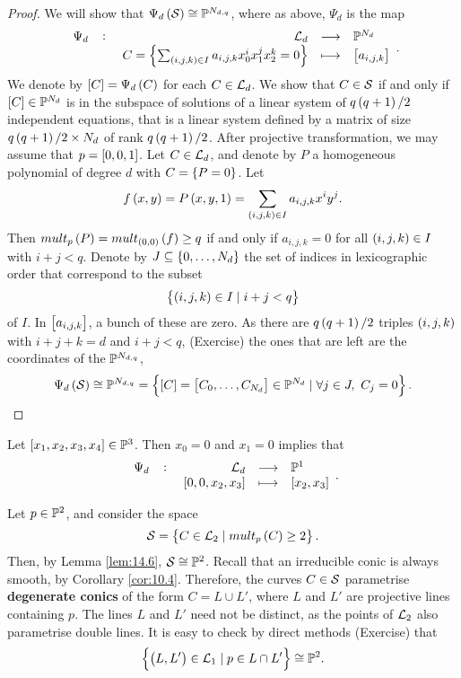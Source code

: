 \begin{proof}
We will show that $ \Psi_d\br{\SS} \cong \P^{N_{d, q}} $, where as above, $ \Psi_d $ is the map
$$ \function[\Psi_d]{\LL_d}{\P^{N_d}}{C = \cbr{\sum_{\br{i, j, k} \in I} a_{i, j, k}x_0^ix_1^jx_2^k = 0}}{\sbr{a_{i, j, k}}}. $$
We denote by $ \sbr{C} = \Psi_d\br{C} $ for each $ C \in \LL_d $. We show that $ C \in \SS $ if and only if $ \sbr{C} \in \P^{N_d} $ is in the subspace of solutions of a linear system of $ q\br{q + 1} / 2 $ independent equations, that is a linear system defined by a matrix of size $ q\br{q + 1} / 2 \times N_d $ of rank $ q\br{q + 1} / 2 $. After projective transformation, we may assume that $ p = \sbr{0, 0, 1} $. Let $ C \in \LL_d $, and denote by $ P $ a homogeneous polynomial of degree $ d $ with $ C = \cbr{P = 0} $. Let
$$ f\br{x, y} = P\br{x, y, 1} = \sum_{\br{i, j, k} \in I} a_{i, j, k}x^iy^j. $$
Then $ mult_p\br{P} = mult_{\br{0, 0}}\br{f} \ge q $ if and only if $ a_{i, j, k} = 0 $ for all $ \br{i, j, k} \in I $ with $ i + j < q $. Denote by $ J \subseteq \cbr{0, \dots, N_d} $ the set of indices in lexicographic order that correspond to the subset
$$ \cbr{\br{i, j, k} \in I \mid i + j < q} $$
of $ I $. In $ \sbr{a_{i, j, k}} $, a bunch of these are zero. As there are $ q\br{q + 1} / 2 $ triples $ \br{i, j, k} $ with $ i + j + k = d $ and $ i + j < q $, (Exercise) the ones that are left are the coordinates of the $ \P^{N_{d, q}} $,
$$ \Psi_d\br{\SS} \cong \P^{N_{d, q}} = \cbr{\sbr{C} = \sbr{C_0, \dots, C_{N_d}} \in \P^{N_d} \mid \forall j \in J, \ C_j = 0}. $$
\end{proof}

\begin{example*}
Let $ \sbr{x_1, x_2, x_3, x_4} \in \P^3 $. Then $ x_0 = 0 $ and $ x_1 = 0 $ implies that
$$ \function[\Psi_d]{\LL_d}{\P^1}{\sbr{0, 0, x_2, x_3}}{\sbr{x_2, x_3}}. $$
\end{example*}

\begin{example}
Let $ p \in \P^2 $, and consider the space
$$ \SS = \cbr{C \in \LL_2 \mid mult_p\br{C} \ge 2}. $$
Then, by Lemma \ref{lem:14.6}, $ \SS \cong \P^2 $. Recall that an irreducible conic is always smooth, by Corollary \ref{cor:10.4}. Therefore, the curves $ C \in \SS $ parametrise \textbf{degenerate conics} of the form $ C = L \cup L' $, where $ L $ and $ L' $ are projective lines containing $ p $. The lines $ L $ and $ L' $ need not be distinct, as the points of $ \LL_2 $ also parametrise double lines. It is easy to check by direct methods (Exercise) that
$$ \cbr{\br{L, L'} \in \LL_1 \mid p \in L \cap L'} \cong \P^2. $$
\end{example}

